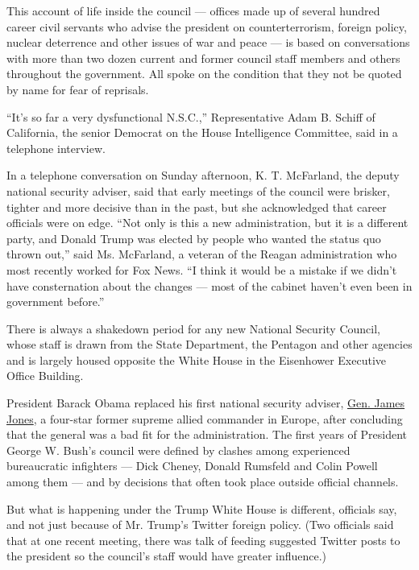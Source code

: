 This account of life inside the council --- offices made up of several
hundred career civil servants who advise the president on
counterterrorism, foreign policy, nuclear deterrence and other issues of
war and peace --- is based on conversations with more than two dozen
current and former council staff members and others throughout the
government. All spoke on the condition that they not be quoted by name
for fear of reprisals.

``It's so far a very dysfunctional N.S.C.,'' Representative Adam B.
Schiff of California, the senior Democrat on the House Intelligence
Committee, said in a telephone interview.

In a telephone conversation on Sunday afternoon, K. T. McFarland, the
deputy national security adviser, said that early meetings of the
council were brisker, tighter and more decisive than in the past, but
she acknowledged that career officials were on edge. ``Not only is this
a new administration, but it is a different party, and Donald Trump was
elected by people who wanted the status quo thrown out,'' said Ms.
McFarland, a veteran of the Reagan administration who most recently
worked for Fox News. ``I think it would be a mistake if we didn't have
consternation about the changes --- most of the cabinet haven't even
been in government before.''

There is always a shakedown period for any new National Security
Council, whose staff is drawn from the State Department, the Pentagon
and other agencies and is largely housed opposite the White House in the
Eisenhower Executive Office Building.

President Barack Obama replaced his first national security adviser,
\href{https://thecaucus.blogs.nytimes.com/2010/10/08/donilon-to-replace-jones-as-national-security-adviser/}{Gen.
James Jones}, a four-star former supreme allied commander in Europe,
after concluding that the general was a bad fit for the administration.
The first years of President George W. Bush's council were defined by
clashes among experienced bureaucratic infighters --- Dick Cheney,
Donald Rumsfeld and Colin Powell among them --- and by decisions that
often took place outside official channels.

But what is happening under the Trump White House is different,
officials say, and not just because of Mr. Trump's Twitter foreign
policy. (Two officials said that at one recent meeting, there was talk
of feeding suggested Twitter posts to the president so the council's
staff would have greater influence.)

